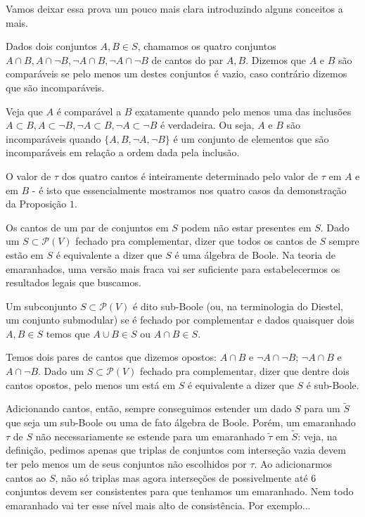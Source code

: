 \documentclass[11pt]{article}
\renewcommand{\textit}[1]{{\fakeitalic#1}}
\theoremstyle{definition}
\theoremstyle{definition}
\theoremstyle{definition}
\theoremstyle{definition}
\theoremstyle{definition}
\theoremstyle{definition}
\theoremstyle{definition}
\theoremstyle{definition}
\newtheorem*{definition*}{Definição}
\newenvironment{definicao*}{
\definecolor{shadecolor}{HTML}{defcfc}
\begin{shaded}
\begin{definition*}
}
{
\end{definition*}
\end{shaded}
}
\theoremstyle{definition}
\theoremstyle{definition}
\theoremstyle{definition}
\theoremstyle{definition}
\theoremstyle{definition}
\begin{document}
Vamos deixar essa prova um pouco mais clara introduzindo alguns conceitos a mais.

\begin{definicao*}
  Dados dois conjuntos $A,B \in S$, chamamos os quatro conjuntos $A \cap B, A \cap \lnot B, \lnot A \cap B, \lnot A \cap \lnot B$ de cantos do par $A,B$. Dizemos que $A$ e $B$ são comparáveis se pelo menos um destes conjuntos é vazio, caso contrário dizemos que são incomparáveis.
\end{definicao*}

Veja que $A$ é comparável a $B$ exatamente quando pelo menos uma das inclusões $A \subset B, A \subset \lnot B, \lnot A \subset B, \lnot A \subset \lnot B$ é verdadeira. Ou seja, $A$ e $B$ são incomparáveis quando $\{A, B, \lnot A, \lnot B\}$ é um conjunto de elementos que são incomparáveis em relação a ordem dada pela inclusão.

O valor de $\tau$ dos quatro cantos é inteiramente determinado pelo valor de $\tau$ em $A$ e em $B$ - é isto que essencialmente mostramos nos quatro casos da demonstração da Proposição $1$.

Os cantos de um par de conjuntos em $S$ podem não estar presentes em $S$. Dado um $S \subset \mathcal{P}(V)$ fechado pra complementar, dizer que todos os cantos de $S$ sempre estão em $S$ é equivalente a dizer que $S$ é uma álgebra de Boole. Na teoria de emaranhados, uma versão mais fraca vai ser suficiente para estabelecermos os resultados legais que buscamos.

\begin{definicao*}
  Um subconjunto $S \subset \mathcal{P}(V)$ é dito sub-Boole (ou, na terminologia do Diestel, um conjunto submodular) se é fechado por complementar e dados quaisquer dois $A,B \in S$ temos que $A \cup B \in S$ ou $A \cap B \in S$.
\end{definicao*}

Temos dois pares de cantos que dizemos \textit{opostos}: $A \cap B$ e $\lnot A \cap \lnot B$; $\lnot A \cap B$ e $A \cap \lnot B$. Dado um $S \subset \mathcal{P}(V)$ fechado pra complementar, dizer que dentre dois cantos opostos, pelo menos um está em $S$ é equivalente a dizer que $S$ é sub-Boole.

Adicionando cantos, então, sempre conseguimos estender um dado $S$ para um $\tilde{S}$ que seja um sub-Boole ou uma de fato álgebra de Boole. Porém, um emaranhado $\tau$ de $S$ não necessariamente se estende para um emaranhado $\tilde{\tau}$ em $\tilde{S}$: veja, na definição, pedimos apenas que triplas de conjuntos com interseção vazia devem ter pelo menos um de seus conjuntos não escolhidos por $\tau$. Ao adicionarmos cantos ao $S$, não só triplas mas agora interseções de possivelmente até $6$ conjuntos devem ser consistentes para que tenhamos um emaranhado. Nem todo emaranhado vai ter esse nível mais alto de consistência. Por exemplo...
\end{document}
